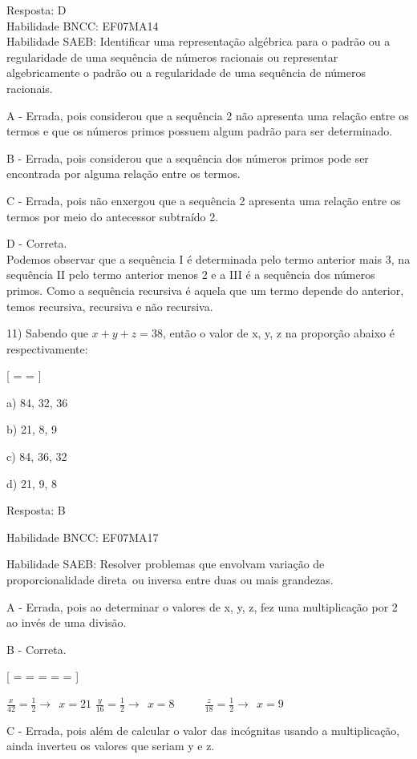 Resposta: D\\
Habilidade BNCC: EF07MA14\\
Habilidade SAEB: Identificar uma representação algébrica para o padrão
ou a regularidade de uma sequência de números racionais ou representar
algebricamente o padrão ou a regularidade de uma sequência de números
racionais.

A - Errada, pois considerou que a sequência 2 não apresenta uma relação
entre os termos e que os números primos possuem algum padrão para ser
determinado.

B - Errada, pois considerou que a sequência dos números primos pode ser
encontrada por alguma relação entre os termos.

C - Errada, pois não enxergou que a sequência 2 apresenta uma relação
entre os termos por meio do antecessor subtraído 2.

D - Correta.\\
Podemos observar que a sequência I é determinada pelo termo anterior
mais 3, na sequência II pelo termo anterior menos 2 e a III é a
sequência dos números primos. Como a sequência recursiva é aquela que um
termo depende do anterior, temos recursiva, recursiva e não recursiva.

11) Sabendo que \(x + y + z = 38\), então o valor de x, y, z na
proporção abaixo é respectivamente:

[ =  = ]

a) 84, 32, 36

b) 21, 8, 9

c) 84, 36, 32

d) 21, 9, 8

Resposta: B

Habilidade BNCC: EF07MA17

Habilidade SAEB: Resolver problemas que envolvam variação de
proporcionalidade direta~ou inversa entre duas ou mais grandezas.

A - Errada, pois ao determinar o valores de x, y, z, fez uma
multiplicação por 2 ao invés de uma divisão.

B - Correta.

[ =  =  =  =  = ]

\(\frac{x}{42} = \frac{1}{2} \rightarrow \ \ x = 21\)
\(\frac{y}{16} = \frac{1}{2} \rightarrow \ \ x = 8\ \ \ \ \ \ \ \ \ \ \ \ \frac{z}{18} = \frac{1}{2} \rightarrow \ \ x = 9\)

C - Errada, pois além de calcular o valor das incógnitas usando a
multiplicação, ainda inverteu os valores que seriam y e z.

